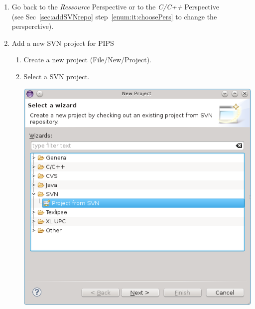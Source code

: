 \documentclass[a4paper]{article}
\begin{document}
\begin{enumerate}
\item Go back to the \emph{Ressource} Perspective or to the \emph{C/C++} Perspective \\
(see Sec~\ref{sec:addSVNrepo} step~\ref{enum:it:choosePers} to change the persperctive).

\item Add a new SVN project for PIPS
\label{enum:it:newproject}
\begin{enumerate}
\item Create a new project (File/New/Project). 
\item Select a SVN project.
\begin{center}
\noindent
\includegraphics[scale=0.4]{eclipse/03-eclipseJUNO-newSVNProject1.png}
\end{center}


\end{enumerate}
\end{enumerate}
\end{document}
